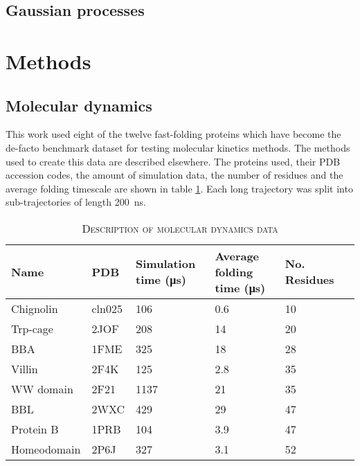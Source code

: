 \documentclass[journal=jacsat,manuscript=article]{achemso}
\begin{document}
\subsection{Gaussian processes}

\section{Methods}
\subsection{Molecular dynamics}

This work used eight of the twelve fast-folding proteins which have become the de-facto benchmark dataset for testing molecular kinetics methods. The methods used to create this data are described elsewhere. The proteins used, their PDB accession codes, the amount of simulation data, the number of residues and the average folding timescale are shown in table \ref{tab:data_description}. Each long trajectory was split into sub-trajectories of length \SI{200}{\nano\second}. 

\begin{table}
    \caption{\textsc{Description of molecular dynamics data}}
    \begin{tabularx}{\textwidth}{llXXXX}
    \toprule
    Name & PDB & Simulation time (\si{\micro\second}) & Average folding time (\si{\micro\second}) & No. Residues & \\
    \midrule
    Chignolin           & cln025    & \num{106}     & \num{0.6} & 10 & \\
    Trp-cage            & 2JOF      & \num{208}     & \num{14}  & 20 & \\
    BBA                 & 1FME      & \num{325}     & \num{18}  & 28 & \\
    Villin              & 2F4K      & \num{125}     & \num{2.8} & 35  &\\
    WW domain           & 2F21      & \num{1137}    & \num{21}  & 35 & \\
    BBL                 & 2WXC      & \num{429}     & \num{29}  & 47  &\\
    Protein B           & 1PRB      & \num{104}     & \num{3.9} & 47 & \\
    Homeodomain         & 2P6J      & \num{327}     & \num{3.1} & 52 & \\
    \bottomrule
    \end{tabularx}
    \label{tab:data_description}
\end{table}
\end{document}
